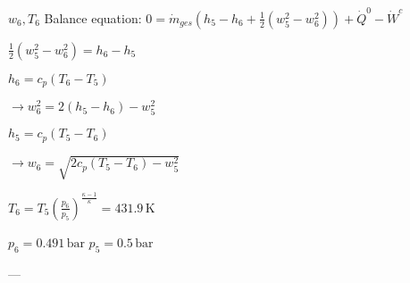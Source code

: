 \( w_6, T_6 \)  
Balance equation:  
\( 0 = \dot{m}_{ges} (h_5 - h_6 + \frac{1}{2} (w_5^2 - w_6^2)) + \dot{Q}^0 - \dot{W}^c \)  

\( \frac{1}{2} (w_5^2 - w_6^2) = h_6 - h_5 \)  

\( h_6 = c_p (T_6 - T_5) \)  

\( \rightarrow w_6^2 = 2 (h_5 - h_6) - w_5^2 \)  

\( h_5 = c_p (T_5 - T_6) \)  

\( \rightarrow w_6 = \sqrt{2 c_p (T_5 - T_6) - w_5^2} \)  

\( T_6 = T_5 \left( \frac{p_6}{p_5} \right)^{\frac{\kappa - 1}{\kappa}} = 431.9 \, \text{K} \)  

\( p_6 = 0.491 \, \text{bar} \)  
\( p_5 = 0.5 \, \text{bar} \)  

---